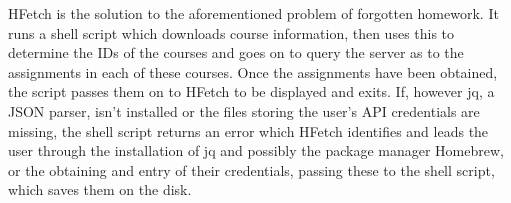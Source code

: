HFetch is the solution to the aforementioned problem of forgotten homework.
It runs a shell script which downloads course information,
	then uses this to determine the IDs of the courses
	and goes on to query the server as to the assignments in each of these courses.
Once the assignments have been obtained,
	the script passes them on to HFetch to be displayed and exits.
If, however jq\cite{jq}, a JSON parser, isn't installed or the files storing the user's API credentials are missing, 
	the shell script returns an error which HFetch identifies and leads the user through the installation of jq
	and possibly the package manager Homebrew,
	or the obtaining and entry of their credentials,
	passing these to the shell script,
	which saves them on the disk.